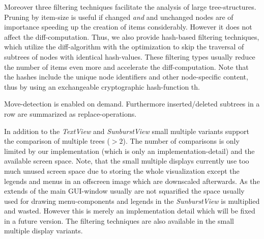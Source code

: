 Moreover three filtering techniques facilitate the analysis of large tree-struc\-tures. Pruning by item-size is useful if changed \emph{and} and unchanged nodes are of importance speeding up the creation of items considerably. However it does not affect the diff-computation. Thus, we also provide hash-based filtering techniques, which utilize the diff-algorithm with the optimization to skip the traversal of subtrees of nodes with identical hash-values. These filtering types usually reduce the number of items even more and accelerate the diff-computation. Note that the hashes include the unique node identifiers and other node-specific content, thus by using an exchangeable cryptographic hash-function th.  

Move-detection is enabled on demand. Furthermore inserted/deleted subtrees in a row are summarized as replace-operations.

In addition to the \emph{TextView} and \emph{SunburstView} small multiple variants support the comparison of multiple trees ($>2$). The number of comparisons is only limited by our implementation (which is only an implementation-detail) and the available screen space. Note, that the small multiple displays currently use too much unused screen space due to storing the whole visualization except the legends and menus in an offscreen image which are downscaled afterwards. As the extends of the main GUI-window usually are not squarified the space usually used for drawing menu-components and legends in the \emph{SunburstView} is multiplied and wasted. However this is merely an implementation detail which will be fixed in a future version. The filtering techniques are also available in the small multiple display variants.
